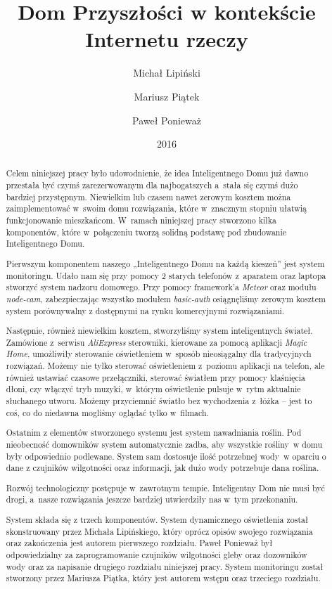 \documentclass{xmgr}
\author   {Michał Lipiński}
\author   {Mariusz Piątek}
\author   {Paweł Ponieważ}
\title    {Dom Przyszłości w kontekście Internetu rzeczy}
\date     {2016}
\begin{document}
\begin{abstract}
	Celem niniejszej pracy było udowodnienie, że idea Inteligentnego Domu już dawno przestała być czymś zarezerwowanym dla najbogatszych a~stała się czymś dużo bardziej przystępnym. Niewielkim lub czasem nawet zerowym kosztem można zaimplementować w~swoim domu rozwiązania, które w~znacznym stopniu ułatwią funkcjonowanie mieszkańcom. W~ramach niniejszej pracy stworzono kilka komponentów, które w~połączeniu tworzą solidną podstawę pod zbudowanie Inteligentnego Domu.
	
	Pierwszym komponentem naszego „Inteligentnego Domu na każdą kieszeń” jest system monitoringu. Udało nam się przy pomocy 2 starych telefonów z~aparatem oraz laptopa stworzyć system nadzoru domowego. Przy pomocy framework'a \emph{Meteor} oraz modułu \emph{node-cam}, zabezpieczając wszystko modułem \emph{basic-auth} osiągnęliśmy zerowym kosztem system porównywalny z dostępnymi na rynku komercyjnymi rozwiązaniami.
	
	Następnie, również niewielkim kosztem, stworzyliśmy system inteligentnych świateł. Zamówione z~serwisu \emph{AliExpress} sterowniki, kierowane za pomocą aplikacji \emph{Magic Home}, umożliwiły sterowanie oświetleniem w~sposób nieosiągalny dla tradycyjnych rozwiązań. Możemy nie tylko sterować oświetleniem z~poziomu aplikacji na telefon, ale również ustawiać czasowe przełączniki, sterować światłem przy pomocy klaśnięcia dłoni, czy włączyć tryb muzyki, w~którym oświetlenie pulsuje w~rytm aktualnie słuchanego utworu. Możemy przyciemnić światło bez wychodzenia z~łóżka – jest to coś, co do niedawna mogliśmy oglądać tylko w~filmach.
	
	Ostatnim z elementów stworzonego systemu jest system nawadniania roślin. Pod nieobecność domowników system automatycznie zadba, aby wszystkie rośliny~w domu były odpowiednio podlewane. System sam dostosuje ilość potrzebnej wody~w oparciu o dane z czujników wilgotności oraz informacji, jak dużo wody potrzebuje dana roślina.
	
	Rozwój technologiczny postępuje w~zawrotnym tempie. Inteligentny Dom nie musi być drogi, a~nasze rozwiązania jeszcze bardziej utwierdziły nas w~tym przekonaniu.
	
	System składa się z trzech komponentów. System dynamicznego oświetlenia został skonstruowany przez Michała Lipińskiego, który oprócz opisów swojego rozwiązania oraz zakończenia jest autorem pierwszego rozdziału. Paweł Ponieważ był odpowiedzialny za zaprogramowanie czujników wilgotności gleby oraz dozowników wody oraz za napisanie drugiego rozdziału niniejszej pracy. System monitoringu został stworzony przez Mariusza Piątka, który jest autorem wstępu oraz trzeciego rozdziału.
\end{abstract}
\clearpage
\end{document}
